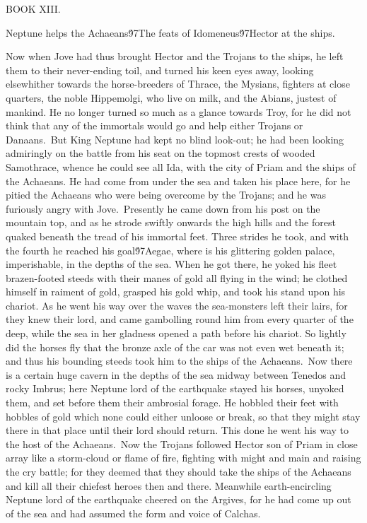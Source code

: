 {  BOOK XIII.\
\pard{}\qj{}

  Neptune helps the Achaeans\'97The feats of Idomeneus\'97Hector at the ships.\
\pard{}\qj{}

  Now when Jove had thus brought Hector and the Trojans to the ships, he left them to their never-ending toil, and turned his keen eyes away, looking elsewhither towards the horse-breeders of Thrace, the Mysians, fighters at close quarters, the noble Hippemolgi, who live on milk, and the Abians, justest of mankind. He no longer turned so much as a glance towards Troy, for he did not think that any of the immortals would go and help either Trojans or Danaans.\
But King Neptune had kept no blind look-out; he had been looking admiringly on the battle from his seat on the topmost crests of wooded Samothrace, whence he could see all Ida, with the city of Priam and the ships of the Achaeans. He had come from under the sea and taken his place here, for he pitied the Achaeans who were being overcome by the Trojans; and he was furiously angry with Jove.\
Presently he came down from his post on the mountain top, and as he strode swiftly onwards the high hills and the forest quaked beneath the tread of his immortal feet. Three strides he took, and with the fourth he reached his goal\'97Aegae, where is his glittering golden palace, imperishable, in the depths of the sea. When he got there, he yoked his fleet brazen-footed steeds with their manes of gold all flying in the wind; he clothed himself in raiment of gold, grasped his gold whip, and took his stand upon his chariot. As he went his way over the waves the sea-monsters left their lairs, for they knew their lord, and came gambolling round him from every quarter of the deep, while the sea in her gladness opened a path before his chariot. So lightly did the horses fly that the bronze axle of the car was not even wet beneath it; and thus his bounding steeds took him to the ships of the Achaeans.\
Now there is a certain huge cavern in the depths of the sea midway between Tenedos and rocky Imbrus; here Neptune lord of the earthquake stayed his horses, unyoked them, and set before them their ambrosial forage. He hobbled their feet with hobbles of gold which none could either unloose or break, so that they might stay there in that place until their lord should return. This done he went his way to the host of the Achaeans.\
Now the Trojans followed Hector son of Priam in close array like a storm-cloud or flame of fire, fighting with might and main and raising the cry battle; for they deemed that they should take the ships of the Achaeans and kill all their chiefest heroes then and there. Meanwhile earth-encircling Neptune lord of the earthquake cheered on the Argives, for he had come up out of the sea and had assumed the form and voice of Calchas.\
}
